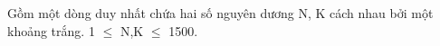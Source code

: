 Gồm một dòng duy nhất chứa hai số nguyên dương N, K cách nhau bởi một khoảng trắng. 1 $\le$ N,K $\le$ 1500.